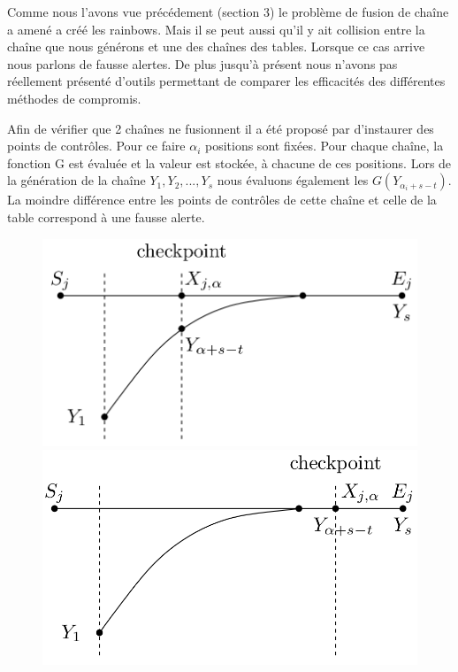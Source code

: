 	Comme nous l'avons vue précédement (section 3) le problème de fusion de chaîne a amené a créé les \glspl{rainbow}. Mais il se peut aussi qu'il y ait collision entre la chaîne que nous générons et une des chaînes des tables. Lorsque ce cas arrive nous parlons de fausse alertes.
	De plus jusqu'à présent nous n'avons pas réellement présenté d'outils permettant de comparer les efficacités des différentes méthodes de compromis.

	Afin de vérifier que 2 chaînes ne fusionnent il a été proposé par \cite{checkpoints} d'instaurer des points de contrôles. Pour ce faire $\alpha_i$ positions sont fixées. Pour chaque chaîne, la fonction G est évaluée et la valeur est stockée, à chacune de ces positions. Lors de la génération de la chaîne $Y_1,Y_2,...,Y_s$ nous évaluons également les $G(Y_{\alpha_i+s-t})$. La moindre différence entre les points de contrôles de cette chaîne et celle de la table correspond à une fausse alerte.

\begin{figure}
	\begin{minipage}{.5\textwidth}
		\includegraphics[width=0.9\linewidth]{other/FalseAlarmDetected.png}
	\end{minipage}
	\begin{minipage}{.5\textwidth}
	    \includegraphics[width=0.9\linewidth]{other/FalseAlarmNotDetected.png}
  	\end{minipage}
\end{figure}

